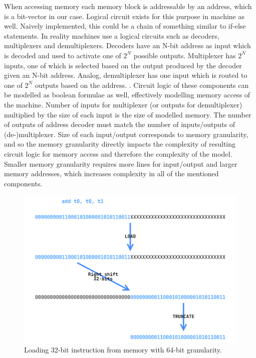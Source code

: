 \documentclass[12pt]{article}
\begin{document}
When accessing memory each memory block is addressable by an address, which is
a bit-vector in our case. Logical circuit exists for this purpose in machine as
well. Naively implemented, this could be a chain of something similar to
if-else statements. In reality machines use a logical circuits such as
decoders, multiplexers and demultiplexers. Decoders have an N-bit address as
input which is decoded and used to activate one of $2^N$ possible outputs.
Multiplexer has $2^N$ inputs, one of which is selected based on the output
produced by the decoder given an N-bit address. Analog, demultiplexer has one
input which is routed to one of $2^N$ outputs based on the address.
\cite{horowitz1989art}. Circuit logic of these components can be modelled as
boolean formulae as well, effectively modelling memory access of the machine.
Number of inputs for multiplexer (or outputs for demultiplexer) multiplied by
the size of each input is the size of modelled memory. The number of outputs of
address decoder must match the number of inputs/outputs of (de-)multiplexer.
Size of each input/output corresponds to memory granularity, and so the memory
granularity directly impacts the complexity of resulting circuit logic for
memory access and therefore the complexity of the model. Smaller memory
granularity requires more lines for input/output and larger memory addresses,
which increases complexity in all of the mentioned components.

\begin{figure}
    \includegraphics[width=\linewidth]{assets/64_bit_instruction_load.png}
    \centering
    \caption{Loading 32-bit instruction from memory with 64-bit granularity.}
    \label{fig:instruction_load_example}
\end{figure}
\end{document}
